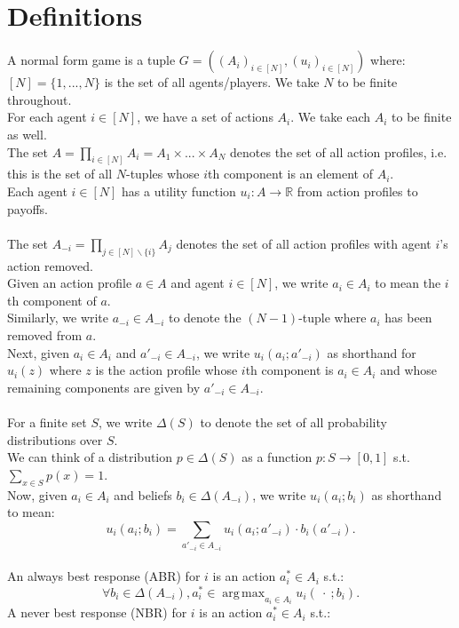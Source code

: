 \documentclass[11pt]{article}
\title{}
\date{}
\DeclareMathOperator*{\argmax}{arg\,max}
\theoremstyle{definition}
\theoremstyle{plain}
\begin{document}
\section{Definitions}

A normal form game is a tuple $G=((A_i)_{i \in [N]},(u_i)_{i \in [N]})$ where:
\\
$[N]=\{1,...,N\}$ is the set of all agents/players. We take $N$ to be finite throughout.
\\
For each agent $i \in [N]$, we have a set of actions $A_i$. We take each $A_i$ to be finite as well.
\\
The set $A=\prod_{i \in [N]} A_i=A_1 \times ... \times A_N$ denotes the set of all action profiles, i.e. this is the set of all $N$-tuples whose $i$th component is an element of $A_i$.  
\\
Each agent $i \in [N]$ has a utility function $u_i:A \to \mathbb{R}$ from action profiles to payoffs.
\\
\\
The set $A_{-i}=\prod_{j \in [N]\backslash\{i\}} A_j$ denotes the set of all action profiles with agent $i$'s action removed.
\\
Given an action profile $a \in A$ and agent $i \in [N]$, we write $a_i \in A_i$ to mean the $i$th component of $a$. 
\\
Similarly, we write $a_{-i}\in A_{-i}$ to denote the $(N-1)$-tuple where $a_i$ has been removed from $a$.
\\
Next, given $a_i\in A_i$ and $a'_{-i} \in A_{-i}$, we write $u_i(a_i;a'_{-i})$ as shorthand for $u_i(z)$ where $z$ is the action profile whose $i$th component is $a_i \in A_i$ and whose remaining components are given by $a'_{-i} \in A_{-i}$.
\\
\\
For a finite set $S$, we write $\Delta(S)$ to denote the set of all probability distributions over $S$. 
\\
We can think of a distribution $p \in \Delta(S)$ as a function $p: S \to [0,1]$ s.t. $\sum_{x \in S} p(x)=1$.  
\\
Now, given $a_i \in A_i$ and beliefs $b_i \in \Delta(A_{-i})$, we write $u_i(a_i;b_i)$ as shorthand to mean:
$$u_i(a_i;b_i)=\sum_{a'_{-i} \in A_{-i}} u_i(a_i;a'_{-i}) \cdot b_i(a'_{-i}).$$ 
\\
An always best response (ABR) for $i$ is an action $a^*_i \in A_i$ s.t.: 
$$\forall b_i \in \Delta(A_{-i}), a^*_i \in \argmax_{a_i \in A_i} u_i(\ \cdot\ ; b_i).$$
A never best response (NBR) for $i$ is an action $a^*_i \in A_i$ s.t.: 
\end{document}
